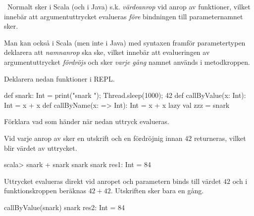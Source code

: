 \QUESTEND





\AdvancedTasks %








\QUESTBEGIN

\Task  \what~Normalt sker i Scala (och i Java) s.k. \emph{värdeanrop} vid anrop av funktioner, vilket innebär att argumentuttrycket evalueras \emph{före} bindningen till parameternamnet sker.

Man kan också i Scala (men inte i Java) med syntaxen \code{=>} framför parametertypen deklarera att \emph{namnanrop} ska ske, vilket innebär att evalueringen av argumentuttrycket \emph{fördröjs} och sker \emph{varje gång} namnet används i metodkroppen.

Deklarera nedan funktioner i REPL.

\begin{Code}
def snark: Int = { print("snark "); Thread.sleep(1000); 42 }
def callByValue(x: Int):   Int = x + x
def callByName(x: => Int): Int = x + x
lazy val zzz = snark
\end{Code}

\noindent Förklara vad som händer när nedan uttryck evalueras.

\Subtask {}

\Subtask {}

\Subtask {}

\Subtask {}

\SOLUTION

\TaskSolved \what

\SubtaskSolved Vid varje anrop av  sker en utskrift och en fördröjnig innan $42$ returneras,  vilket blir värdet av uttrycket.
\begin{REPL}
scala> snark + snark
snark snark res1: Int = 84
\end{REPL}

\SubtaskSolved Uttrycket  evalueras direkt vid anropet och parametern  binds till värdet $42$ och i funktionskroppen beräknas $42+42$. Utskriften sker bara en gång.
\begin{REPL}
callByValue(snark)
snark res2: Int = 84
\end{REPL}

